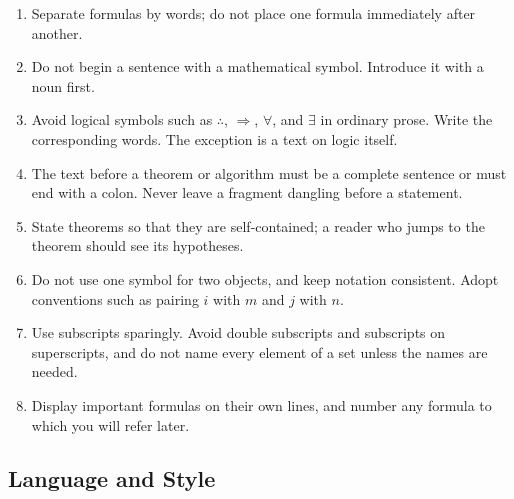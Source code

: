 \documentclass[11pt]{article}
\begin{document}
\begin{enumerate}[label=\arabic*., leftmargin=*]
  \item Separate formulas by words; do not place one formula immediately after another.
  \item Do not begin a sentence with a mathematical symbol. Introduce it with a noun first.
  \item Avoid logical symbols such as $\therefore$, $\Rightarrow$, $\forall$, and $\exists$ in ordinary prose. Write the corresponding words. The exception is a text on logic itself.
  \item The text before a theorem or algorithm must be a complete sentence or must end with a colon. Never leave a fragment dangling before a statement.
  \item State theorems so that they are self-contained; a reader who jumps to the theorem should see its hypotheses.
  \item Do not use one symbol for two objects, and keep notation consistent. Adopt conventions such as pairing $i$ with $m$ and $j$ with $n$.
  \item Use subscripts sparingly. Avoid double subscripts and subscripts on superscripts, and do not name every element of a set unless the names are needed.
  \item Display important formulas on their own lines, and number any formula to which you will refer later.
\end{enumerate}

\subsection{Language and Style}
\end{document}
